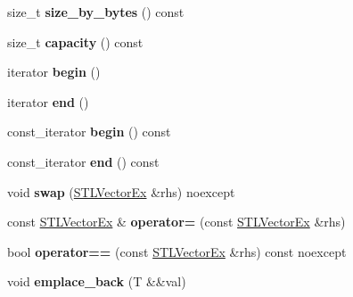 \begin{DoxyCompactItemize}
size\+\_\+t {\bfseries size\+\_\+by\+\_\+bytes} () const
\item 
\mbox{\label{classnabla_1_1_s_t_l_vector_ex_a44ff1b69309686b9b3f1ea125982b078}} 
size\+\_\+t {\bfseries capacity} () const
\item 
\mbox{\label{classnabla_1_1_s_t_l_vector_ex_a01d7928bf1a4aa33e6e147df5c9a2f63}} 
iterator {\bfseries begin} ()
\item 
\mbox{\label{classnabla_1_1_s_t_l_vector_ex_ad7749220f425a7c8393c2896aa47e029}} 
iterator {\bfseries end} ()
\item 
\mbox{\label{classnabla_1_1_s_t_l_vector_ex_aa921d1f28239e84f121f25687ab0973b}} 
const\+\_\+iterator {\bfseries begin} () const
\item 
\mbox{\label{classnabla_1_1_s_t_l_vector_ex_a9de34c829ca66533ccabff15fb62f06f}} 
const\+\_\+iterator {\bfseries end} () const
\item 
\mbox{\label{classnabla_1_1_s_t_l_vector_ex_a300a87f98ace411fc3ce084ca232339c}} 
void {\bfseries swap} (\mbox{\hyperlink{classnabla_1_1_s_t_l_vector_ex}{S\+T\+L\+Vector\+Ex}} \&rhs) noexcept
\item 
\mbox{\label{classnabla_1_1_s_t_l_vector_ex_aadefb048d6aebd038536785fe4abe486}} 
const \mbox{\hyperlink{classnabla_1_1_s_t_l_vector_ex}{S\+T\+L\+Vector\+Ex}} \& {\bfseries operator=} (const \mbox{\hyperlink{classnabla_1_1_s_t_l_vector_ex}{S\+T\+L\+Vector\+Ex}} \&rhs)
\item 
\mbox{\label{classnabla_1_1_s_t_l_vector_ex_a4114f4e98459edfe441d878c995e6468}} 
bool {\bfseries operator==} (const \mbox{\hyperlink{classnabla_1_1_s_t_l_vector_ex}{S\+T\+L\+Vector\+Ex}} \&rhs) const noexcept
\item 
\mbox{\label{classnabla_1_1_s_t_l_vector_ex_a66394a10b1e5e1a5bbe0cfa6198a48f8}} 
void {\bfseries emplace\+\_\+back} (T \&\&val)
\item 

\end{DoxyCompactItemize}
